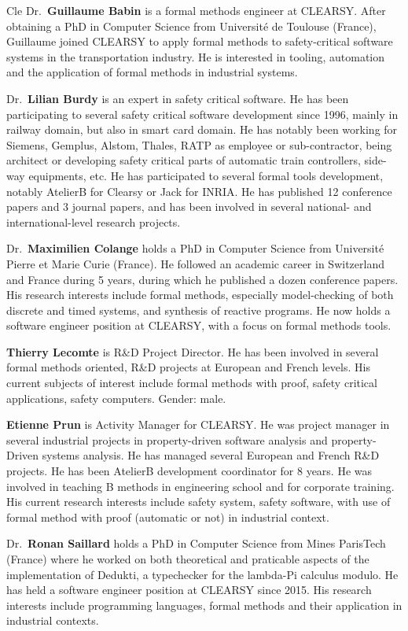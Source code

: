 \begin{sitedescription}{Cle}
Dr.\ \textbf{Guillaume Babin} is a formal methods engineer at CLEARSY. After obtaining a PhD in Computer Science from Université de 
Toulouse (France), Guillaume joined CLEARSY to apply formal methods to safety-critical software systems in the transportation industry. 
He is interested in tooling, automation and the application of formal methods in industrial systems.

Dr.\ \textbf{Lilian Burdy} is an expert in safety critical software. He has been participating to several safety critical software 
development since 1996, mainly in railway domain, but also in smart card domain. He has notably been working for Siemens, Gemplus, 
Alstom, Thales, RATP as employee or sub-contractor, being architect or developing safety critical parts of automatic train controllers, 
side-way equipments, etc. He has participated to several formal tools development, notably AtelierB for Clearsy or Jack for INRIA. He 
has published 12 conference papers and 3 journal papers, and has been involved in several national- and international-level research 
projects.

Dr.\ \textbf{Maximilien Colange} holds a PhD in Computer Science from Université Pierre et Marie Curie (France). He followed an 
academic career in Switzerland and France during 5 years, during which he published a dozen conference papers. His research interests
include formal methods, especially model-checking of both discrete and timed systems, and synthesis of reactive programs. He now holds 
a software engineer position at CLEARSY, with a focus on formal methods tools.

\textbf{Thierry Lecomte} is R\&D Project Director. He has been involved in several formal methods oriented, R\&D projects at European 
and French levels. His current subjects of interest include formal methods with proof, safety critical applications, safety computers. 
Gender: male.

\textbf{Etienne Prun} is Activity Manager for CLEARSY. He was project manager in several industrial projects in property-driven 
software analysis and property-Driven systems analysis. He has managed several European and French R&D projects. He has been AtelierB 
development coordinator for 8 years. He was involved in teaching B methods in engineering school and for corporate training. His current 
research interests include safety system, safety software, with use of formal method with proof (automatic or not) in industrial 
context.

Dr.\ \textbf{Ronan Saillard} holds a PhD in Computer Science from Mines ParisTech (France) where he worked on both theoretical and praticable 
aspects of the implementation of Dedukti, a typechecker for the lambda-Pi calculus modulo. He has held a software engineer position at 
CLEARSY since 2015. His research interests include programming languages, formal methods and their application in industrial contexts.


\end{sitedescription}
